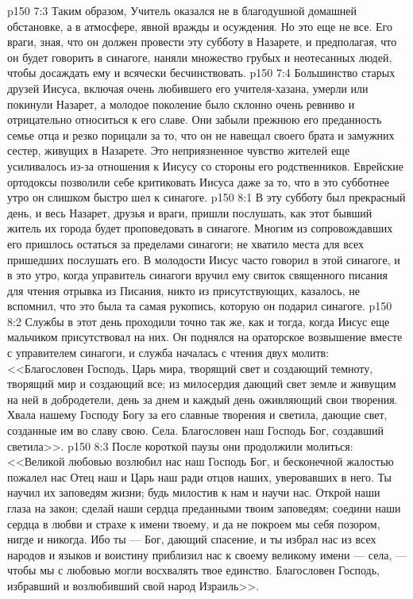 \vs p150 7:3 Таким образом, Учитель оказался не в благодушной домашней обстановке, а в атмосфере, явной вражды и осуждения. Но это еще не все. Его враги, зная, что он должен провести эту субботу в Назарете, и предполагая, что он будет говорить в синагоге, наняли множество грубых и неотесанных людей, чтобы досаждать ему и всячески бесчинствовать.
\vs p150 7:4 Большинство старых друзей Иисуса, включая очень любившего его учителя\hyp{}хазана, умерли или покинули Назарет, а молодое поколение было склонно очень ревниво и отрицательно относиться к его славе. Они забыли прежнюю его преданность семье отца и резко порицали за то, что он не навещал своего брата и замужних сестер, живущих в Назарете. Это неприязненное чувство жителей еще усиливалось из\hyp{}за отношения к Иисусу со стороны его родственников. Еврейские ортодоксы позволили себе критиковать Иисуса даже за то, что в это субботнее утро он слишком быстро шел к синагоге.
\vs p150 8:1 В эту субботу был прекрасный день, и весь Назарет, друзья и враги, пришли послушать, как этот бывший житель их города будет проповедовать в синагоге. Многим из сопровождавших его пришлось остаться за пределами синагоги; не хватило места для всех пришедших послушать его. В молодости Иисус часто говорил в этой синагоге, и в это утро, когда управитель синагоги вручил ему свиток священного писания для чтения отрывка из Писания, никто из присутствующих, казалось, не вспомнил, что это была та самая рукопись, которую он подарил синагоге.
\vs p150 8:2 Службы в этот день проходили точно так же, как и тогда, когда Иисус еще мальчиком присутствовал на них. Он поднялся на ораторское возвышение вместе с управителем синагоги, и служба началась с чтения двух молитв: <<Благословен Господь, Царь мира, творящий свет и создающий темноту, творящий мир и создающий все; из милосердия дающий свет земле и живущим на ней в добродетели, день за днем и каждый день оживляющий свои творения. Хвала нашему Господу Богу за его славные творения и светила, дающие свет, созданные им во славу свою. Села. Благословен наш Господь Бог, создавший светила>>.
\vs p150 8:3 После короткой паузы они продолжили молиться: <<Великой любовью возлюбил нас наш Господь Бог, и бесконечной жалостью пожалел нас Отец наш и Царь наш ради отцов наших, уверовавших в него. Ты научил их заповедям жизни; будь милостив к нам и научи нас. Открой наши глаза на закон; сделай наши сердца преданными твоим заповедям; соедини наши сердца в любви и страхе к имени твоему, и да не покроем мы себя позором, нигде и никогда. Ибо ты --- Бог, дающий спасение, и ты избрал нас из всех народов и языков и воистину приблизил нас к своему великому имени --- села, --- чтобы мы с любовью могли восхвалять твое единство. Благословен Господь, избравший и возлюбивший свой народ Израиль>>.
